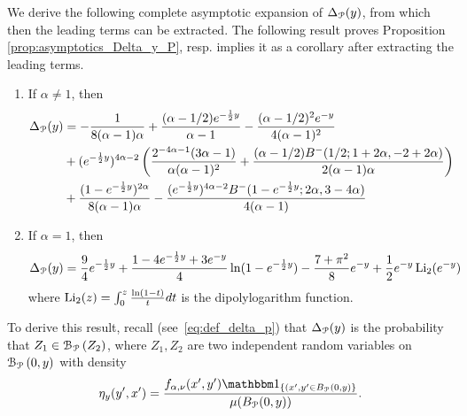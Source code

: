 We derive the following complete asymptotic expansion of $\Delta_{{\mathcal P}}(y)$, from which then the leading terms can be extracted. The following result proves Proposition \ref{prop:asymptotics_Delta_y_P}, resp. implies it as a corollary after extracting the leading terms.
\begin{proposition}\label{prop:full_expression_delta_P}
\begin{enumerate}
	\item If $\alpha \not = 1$, then
	\begin{align*}
	 \Delta_{{\mathcal P}}(y) &=-\frac{1}{8 (\alpha - 1) \alpha} + \frac{(\alpha - 1/2) e^{-\frac{1}{2}y}}{\alpha - 1} - \frac{(\alpha - 1/2)^2 e^{-y}}{
		4 (\alpha - 1)^2} \\
	&+ 
	(e^{-\frac{1}{2}y})^{4\alpha -2} \left(\frac{2^{-4 \alpha-1} (3 \alpha - 1)}{\alpha (\alpha - 1)^2} + \frac{(\alpha - 
		1/2 ) B^-(1/2; 1 + 2 \alpha, 
		-2 + 2 \alpha)}{2(\alpha - 1) \alpha} \right) \\
	&+ \frac{(1 - 
		e^{-\frac{1}{2}y})^{2 \alpha}}{8 (\alpha - 1) \alpha} - \frac{  
		(e^{-\frac{1}{2}y})^{4 \alpha - 2} B^-(1 - e^{-\frac{1}{2}y}; 2 \alpha, 3 - 4 \alpha)}{4 (\alpha - 1)}
	\end{align*}
	\item If $\alpha = 1$, then
	\begin{align*}
	&\Delta_{{\mathcal P}}(y) =\frac{9}{4} e^{-\frac{1}{2}y} + \frac{1 - 4 e^{-\frac{1}{2}y} + 3 e^{-y}}{4}\ln(1 - e^{-\frac{1}{2}y}) - \frac{7+\pi^2}{8}
e^{-y}  + 
\frac{1}{2}e^{-y}\operatorname{Li}_2(e^{-y})
	\end{align*}
	where $\operatorname{Li}_2(z)=\int_0^z \frac{\ln(1-t)}{t}dt$ is the dipolylogarithm function.
\end{enumerate}
\end{proposition}



To derive this result, recall (see~\eqref{eq:def_delta_p}) that $\Delta_{{\mathcal P}}(y)$ is the probability that $Z_1 \in {\mathcal B}_{{\mathcal P}}\left(Z_2\right)$, where $Z_1, Z_2$ are two independent random variables on ${\mathcal B}_{{\mathcal P}}\left(0,y\right)$ with density 
\[
	\eta_{y}(y^\prime,x^\prime) = \frac{f_{\alpha,\nu}(x^\prime, y^\prime)\ind{(x^\prime, y^\prime \in B_{\Pcal}(0,y)}}{\mu(B_{\Pcal}(0,y))}.
\]

